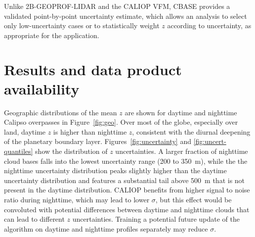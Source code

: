 \documentclass[essd,manuscript]{copernicus}
\begin{document}
Unlike 2B-GEOPROF-LIDAR and the CALIOP VFM, CBASE provides a validated
point-by-point uncertainty estimate, which allows an analysis to select only
low-uncertainty cases or to statistically weight \ensuremath{z}{} according to
uncertainty, as appropriate for the application.

\section{Results and data product availability}
\label{sec:results}

Geographic distributions of the mean \ensuremath{z}{} are shown for daytime and nighttime
Calipso overpasses in Figure~\ref{fig:geo}.  Over most of the globe, especially
over land, daytime \ensuremath{z}{} is higher than nighttime \ensuremath{z}{}, consistent with the
diurnal deepening of the planetary boundary layer.
Figures~\ref{fig:uncertainty} and \ref{fig:uncert-quantiles} show the
distribution of \ensuremath{z}{} uncertainties.  A larger fraction of nighttime cloud
bases falls into the lowest uncertainty range (200 to 350~\unit{m}), while the
the nighttime uncertainty distribution peaks slightly higher than the daytime
uncertainty distribution and features a substantial tail above 500~\unit{m} that
is not present in the daytime distribution.  CALIOP benefits from higher signal
to noise ratio during nighttime, which may lead to lower $\sigma$, but this
effect would be convoluted with potential differences between daytime and
nighttime clouds that can lead to different \ensuremath{z}{} uncertainties.  Training a
potential future update of the algorithm on daytime and nighttime profiles
separately may reduce $\sigma$.
\end{document}

